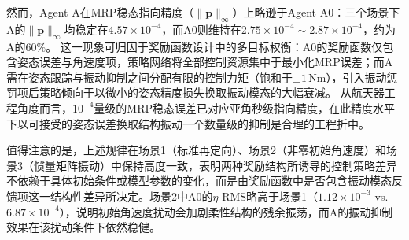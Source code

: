 然而，Agent A在MRP稳态指向精度（$\|\mathbf{p}\|_\infty$）上略逊于Agent A0：三个场景下A的$\|\mathbf{p}\|_\infty$均稳定在$4.57{\times}10^{-4}$，而A0则维持在$2.75{\times}10^{-4}{\sim}2.87{\times}10^{-4}$，约为A的$60\%$。
这一现象可归因于奖励函数设计中的多目标权衡：A0的奖励函数仅包含姿态误差与角速度项，策略网络将全部控制资源集中于最小化MRP误差；而A需在姿态跟踪与振动抑制之间分配有限的控制力矩（饱和于$\pm 1$\,Nm），引入振动惩罚项后策略倾向于以微小的姿态精度损失换取振动模态的大幅衰减。
从航天器工程角度而言，$10^{-4}$量级的MRP稳态误差已对应亚角秒级指向精度，在此精度水平下以可接受的姿态误差换取结构振动一个数量级的抑制是合理的工程折中。

值得注意的是，上述规律在场景1（标准再定向）、场景2（非零初始角速度）和场景3（惯量矩阵摄动）中保持高度一致，表明两种奖励结构所诱导的控制策略差异不依赖于具体初始条件或模型参数的变化，而是由奖励函数中是否包含振动模态反馈项这一结构性差异所决定。场景2中A0的$\eta$ RMS略高于场景1（$1.12{\times}10^{-3}$ vs.\ $6.87{\times}10^{-4}$），说明初始角速度扰动会加剧柔性结构的残余振荡，而A的振动抑制效果在该扰动条件下依然稳健。
